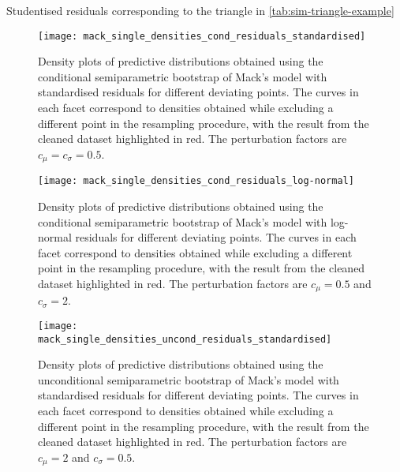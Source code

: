 \documentclass[a4paper]{book}
\begin{document}
\begin{table}[!htb]
  
  \caption{Studentised residuals corresponding to the triangle in \cref{tab:sim-triangle-example}}
  \label{tab:resids-studentised-example}
\end{table}


\begin{landscape}
  \begin{figure}
    \centering
    \texttt{[image: mack\_single\_densities\_cond\_residuals\_standardised]}
    \caption{Density plots of predictive distributions obtained using the conditional semiparametric bootstrap of Mack's model with standardised residuals for different deviating points. The curves in each facet correspond to densities obtained while excluding a different point in the resampling procedure, with the result from the cleaned dataset highlighted in red. The perturbation factors are $c_\mu = c_\sigma = 0.5$.}
    \label{fig:mack-single-cond-semiparam-standardised}
  \end{figure}
\end{landscape}

\begin{landscape}
  \begin{figure}
    \centering
    \texttt{[image: mack\_single\_densities\_cond\_residuals\_log-normal]}
    \caption{Density plots of predictive distributions obtained using the conditional semiparametric bootstrap of Mack's model with log-normal residuals for different deviating points. The curves in each facet correspond to densities obtained while excluding a different point in the resampling procedure, with the result from the cleaned dataset highlighted in red. The perturbation factors are $c_\mu = 0.5$ and $c_\sigma = 2$.}
    \label{fig:mack-single-cond-semiparam-log-normal}
  \end{figure}
\end{landscape}

\begin{landscape}
  \begin{figure}
    \centering
    \texttt{[image: mack\_single\_densities\_uncond\_residuals\_standardised]}
    \caption{Density plots of predictive distributions obtained using the unconditional semiparametric bootstrap of Mack's model with standardised residuals for different deviating points. The curves in each facet correspond to densities obtained while excluding a different point in the resampling procedure, with the result from the cleaned dataset highlighted in red. The perturbation factors are $c_\mu = 2$ and $c_\sigma = 0.5$.}
    \label{fig:mack-single-uncond-semiparam-standardised}
  \end{figure}
\end{landscape}
\end{document}
